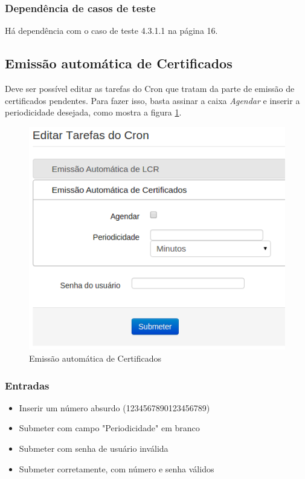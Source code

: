 \subsubsection{Dependência de casos de teste}
Há dependência com o caso de teste 4.3.1.1 na página 16.

\subsection{Emissão automática de Certificados}

Deve ser possível editar as tarefas do Cron que tratam da parte de emissão de certificados pendentes. Para fazer isso, basta assinar a caixa \textit{Agendar} e inserir a periodicidade desejada, como mostra a figura \ref{fig:croncert}.

\begin{figure}[ht]
     \centering
     \includegraphics[scale=0.5]{images/croncert.png}
     \caption{Emissão automática de Certificados}
     \label{fig:croncert}
\end{figure}

\subsubsection{Entradas}

\begin{itemize}

	\item Inserir um número absurdo (1234567890123456789)
	\item Submeter com campo "Periodicidade" em branco
	\item Submeter com senha de usuário inválida
	\item Submeter corretamente, com número e senha válidos
	
\end{itemize}

